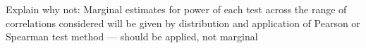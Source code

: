 Explain why not: Marginal estimates for power of each test across the range of correlations considered will be given by distribution and application of Pearson or Spearman test method  --- should be applied, not marginal







